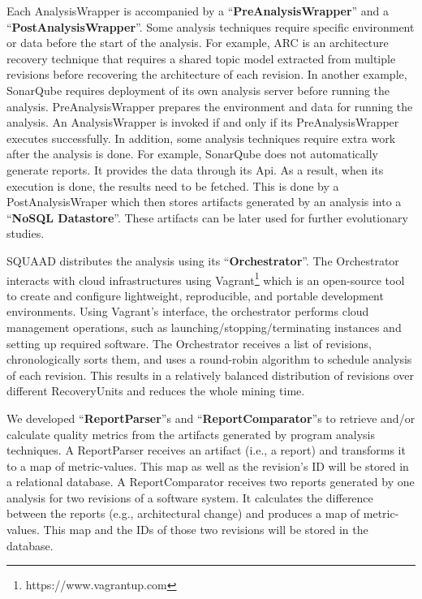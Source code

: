 Each AnalysisWrapper is accompanied by a ``\textbf{PreAnalysisWrapper}'' and a ``\textbf{PostAnalysisWrapper}''.
Some analysis techniques require specific environment or data before the start of the analysis.
For example, ARC \cite{garcia2013comparative} is an architecture recovery technique that requires a shared topic model extracted from multiple revisions before recovering the architecture of each revision.
In another example, SonarQube requires deployment of its own analysis server before running the analysis.
PreAnalysisWrapper prepares the environment and data for running the analysis. 
An AnalysisWrapper is invoked if and only if its PreAnalysisWrapper executes successfully.
In addition, some analysis techniques require extra work after the analysis is done. 
For example, SonarQube does not automatically generate reports.
It provides the data through its Api.
As a result, when its execution is done, the results need to be fetched.
This is done by a PostAnalysisWraper which then stores artifacts generated by an analysis into a ``\textbf{NoSQL Datastore}''.
These artifacts can be later used for further evolutionary studies.

SQUAAD distributes the analysis using its ``\textbf{Orchestrator}''.
The Orchestrator interacts with cloud infrastructures using Vagrant\footnote{https://www.vagrantup.com} which is an open-source tool to create and configure lightweight, reproducible, and portable development environments.
Using Vagrant's interface, the orchestrator performs cloud management operations, such as launching/stopping/terminating instances and setting up required software.
The Orchestrator receives a list of revisions, chronologically sorts them, and uses a round-robin algorithm to schedule analysis of each revision.
This results in a relatively balanced distribution of revisions over different RecoveryUnits and reduces the whole mining time.

We developed ``\textbf{ReportParser}''s and ``\textbf{ReportComparator}''s to retrieve and/or calculate quality metrics from the artifacts generated by program analysis techniques.
A ReportParser receives an artifact (i.e., a report) and transforms it to a map of metric-values.
This map as well as the revision's ID will be stored in a relational database.
A ReportComparator receives two reports generated by one analysis for two revisions of a software system.
It calculates the difference between the reports (e.g., architectural change) and produces a map of metric-values.
This map and the IDs of those two revisions will be stored in the database.

